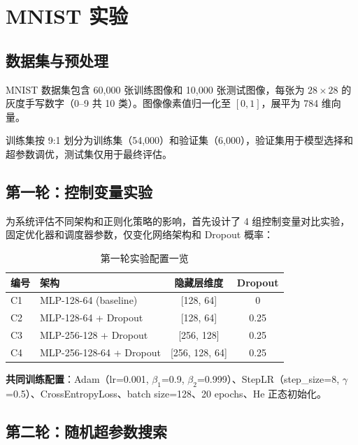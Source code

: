 \documentclass[12pt,a4paper]{ctexart}
\begin{document}
\section{MNIST 实验}

\subsection{数据集与预处理}

MNIST 数据集包含 60,000 张训练图像和 10,000 张测试图像，每张为 $28 \times 28$ 的灰度手写数字（0--9 共 10 类）。图像像素值归一化至 $[0, 1]$，展平为 784 维向量。

训练集按 9:1 划分为训练集（54,000）和验证集（6,000），验证集用于模型选择和超参数调优，测试集仅用于最终评估。

\subsection{第一轮：控制变量实验}

为系统评估不同架构和正则化策略的影响，首先设计了 4 组控制变量对比实验，固定优化器和调度器参数，仅变化网络架构和 Dropout 概率：

\begin{table}[H]
\centering
\caption{第一轮实验配置一览}
\begin{tabular}{@{}llcc@{}}
\toprule
\textbf{编号} & \textbf{架构} & \textbf{隐藏层维度} & \textbf{Dropout} \\
\midrule
C1 & MLP-128-64 (baseline)   & [128, 64]      & 0    \\
C2 & MLP-128-64 + Dropout    & [128, 64]      & 0.25 \\
C3 & MLP-256-128 + Dropout   & [256, 128]     & 0.25 \\
C4 & MLP-256-128-64 + Dropout& [256, 128, 64] & 0.25 \\
\bottomrule
\end{tabular}
\end{table}

\textbf{共同训练配置}：Adam（lr=0.001, $\beta_1$=0.9, $\beta_2$=0.999）、StepLR（step\_size=8, $\gamma$=0.5）、CrossEntropyLoss、batch size=128、20 epochs、He 正态初始化。

\subsection{第二轮：随机超参数搜索}
\end{document}
